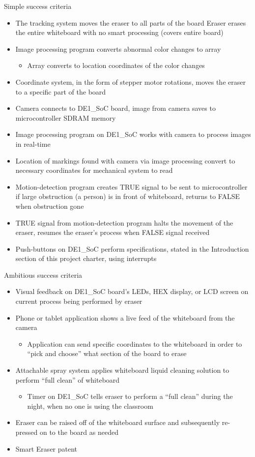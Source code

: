 Simple success criteria
\begin{itemize}
\item The tracking system moves the eraser to all parts of the board
Eraser erases the entire whiteboard with no smart processing (covers entire board)
\item Image processing program converts abnormal color changes to array
\begin{itemize}
\item Array converts to location coordinates of the color changes
\end{itemize}
\item Coordinate system, in the form of stepper motor rotations, moves the eraser to a specific part of the board
\item Camera connects to DE1\_SoC board, image from camera saves to microcontroller SDRAM memory
\item Image processing program on DE1\_SoC works with camera to process images in real-time
\item Location of markings found with camera via image processing convert to necessary coordinates for mechanical system to read
\item Motion-detection program creates TRUE signal to be sent to microcontroller if large obstruction (a person) is in front of whiteboard, returns to FALSE when obstruction gone
\item TRUE signal from motion-detection program halts the movement of the eraser, resumes the eraser’s process when FALSE signal received
\item Push-buttons on DE1\_SoC perform specifications, stated in the Introduction section of this project charter, using interrupts \\
\end{itemize}

Ambitious success criteria
\begin{itemize}
\item Visual feedback on DE1\_SoC board’s LEDs, HEX display, or LCD screen on current process being performed by eraser
\item Phone or tablet application shows a live feed of the whiteboard from the camera
\begin{itemize}
\item Application can send specific coordinates to the whiteboard in order to “pick and choose” what section of the board to erase
\end{itemize}
\item Attachable spray system applies whiteboard liquid cleaning solution to perform “full clean” of whiteboard
\begin{itemize}
\item Timer on DE1\_SoC tells eraser to perform a “full clean” during the night, when no one is using the classroom
\end{itemize}
\item Eraser can be raised off of the whiteboard surface and subsequently re-pressed on to the board as needed
\item Smart Eraser patent
\end{itemize}
 
